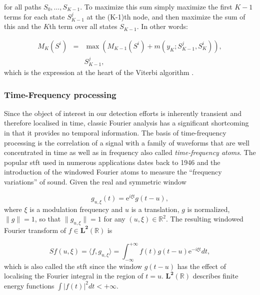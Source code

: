 for all paths $S_0,\ldots, S_{K-1}$.
To maximize this sum simply maximize the first $K-1$ terms for each state $S^j_{K-1}$ at the (K-1)th node, and then maximize the sum of this and the $K$th term over all states $S_{K-1}$. In other words:

\begin{eqnarray}\label{eq:viterbiLitRev5}
M_K(S^i) &=& \max \left( M_{K-1}(S^i) + m(y_K ; S_{K-1}^j, S_{K}^i)\right), \\ \nonumber
& & S_{K-1}^j,
\end{eqnarray}
which is the expression at the heart of the Viterbi algorithm \cite{Viterbi2006}.


\subsubsection{Time-Frequency processing}
Since the object of interest in our detection efforts is inherently transient and therefore localised in time, classic Fourier analysis has a significant shortcoming in that it provides no temporal information. The basis of time-frequency processing is the correlation of a signal with a family of waveforms that are well concentrated in time as well as in frequency \cite{Mallat1999} also called \emph{time-frequency atoms}\cite{Gabor1946}. The popular \gls{stft} used in numerous applications dates back to 1946 and the introduction of the windowed Fourier atoms to measure the ``frequency variations'' of sound. Given the real and symmetric window

\begin{equation}\label{eq:Mallat1999}
g_{u,\xi}(t) = \mathrm{e}^{i\xi t}g(t-u),
\end{equation}
where $\xi$ is a modulation frequency and $u$ is a translation, $g$ is normalized, $\|g\| = 1$, so that $\|g_{u,\xi}\| = 1$ for any $(u, \xi) \in \mathbb{R}^2$. The resulting windowed Fourier transform of $f \in \mathbf{L^2}(\mathbb{R})$ is

\begin{equation}\label{eq:Mallat1999_2}
S f(u, \xi) = \langle f, g_{u,\xi} \rangle = \int^{+\infty}_{-\infty}  f(t)g(t-u)\mathrm{e}^{-i\xi t} dt,
\end{equation}
which is also called the \gls{stft} since the window $g(t-u)$ has the effect of localising the Fourier integral in the region of $t=u$. $\mathbf{L^2}(\mathbb{R})$ describes finite energy functions $\int |f(t)|^2 dt < + \infty$.


